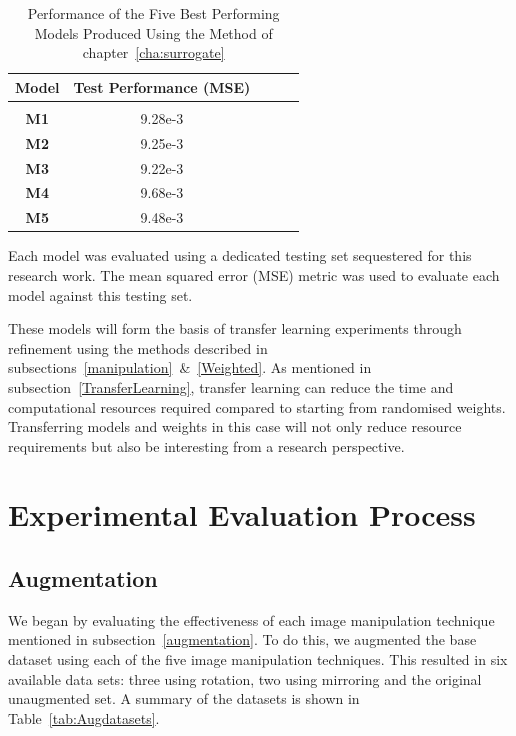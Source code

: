 \begin{table}[h!]
	\begin{center}
		
		\begin{tabular}{c|c|c|r|c} %
			\textbf{Model} & \textbf{Test Performance (MSE)}  \\
			
			\hline
			& \\
			\textbf{M1} &  9.28e-3 \\
			\textbf{M2}   & 9.25e-3 \\ 
			\textbf{M3}  & 9.22e-3  \\
			\textbf{M4} &  9.68e-3 \\
			\textbf{M5} &   9.48e-3  \\
			
			
		\end{tabular}
		\caption{Performance of the Five Best Performing Models Produced Using the Method of chapter~\ref{cha:surrogate}} {Each model was evaluated using a dedicated testing set sequestered for this research work. The mean squared error (MSE) metric was used to evaluate each model against this testing set.}
		\label{tab:paper1results}
		\end{center}
\end{table}

These models will form the basis of transfer learning experiments through refinement using the methods described in subsections~\ref{manipulation}~\&~\ref{Weighted}. As mentioned in subsection~\ref{TransferLearning}, transfer learning can reduce the time and computational resources required compared to starting from randomised weights. Transferring models and weights in this case will not only reduce resource requirements but also be interesting from a research perspective. 

\section{Experimental Evaluation Process} 

\subsection{Augmentation} \label{augmentMethod}

We began by evaluating the effectiveness of each image manipulation technique mentioned in subsection~\ref{augmentation}. To do this, we augmented the base dataset using each of the five image manipulation techniques. This resulted in six available data sets: three using rotation, two using mirroring and the original unaugmented set. A summary of the datasets is shown in Table~\ref{tab:Augdatasets}.
\\

